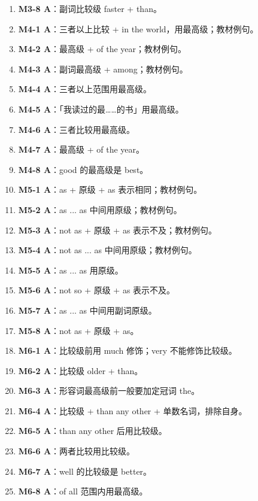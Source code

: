 \documentclass[11pt,a4paper]{ctexart}
\begin{document}
\begin{enumerate}[leftmargin=1.6em,itemsep=2pt]
\item \textbf{M3-8 A}：副词比较级 faster + than。
\item \textbf{M4-1 A}：三者以上比较 + in the world，用最高级；教材例句。
\item \textbf{M4-2 A}：最高级 + of the year；教材例句。
\item \textbf{M4-3 A}：副词最高级 + among；教材例句。
\item \textbf{M4-4 A}：三者以上范围用最高级。
\item \textbf{M4-5 A}：「我读过的最……的书」用最高级。
\item \textbf{M4-6 A}：三者比较用最高级。
\item \textbf{M4-7 A}：最高级 + of the year。
\item \textbf{M4-8 A}：good 的最高级是 best。
\item \textbf{M5-1 A}：as + 原级 + as 表示相同；教材例句。
\item \textbf{M5-2 A}：as ... as 中间用原级；教材例句。
\item \textbf{M5-3 A}：not as + 原级 + as 表示不及；教材例句。
\item \textbf{M5-4 A}：not as ... as 中间用原级；教材例句。
\item \textbf{M5-5 A}：as ... as 用原级。
\item \textbf{M5-6 A}：not so + 原级 + as 表示不及。
\item \textbf{M5-7 A}：as ... as 中间用副词原级。
\item \textbf{M5-8 A}：not as + 原级 + as。
\item \textbf{M6-1 A}：比较级前用 much 修饰；very 不能修饰比较级。
\item \textbf{M6-2 A}：比较级 older + than。
\item \textbf{M6-3 A}：形容词最高级前一般要加定冠词 the。
\item \textbf{M6-4 A}：比较级 + than any other + 单数名词，排除自身。
\item \textbf{M6-5 A}：than any other 后用比较级。
\item \textbf{M6-6 A}：两者比较用比较级。
\item \textbf{M6-7 A}：well 的比较级是 better。
\item \textbf{M6-8 A}：of all 范围内用最高级。
\end{enumerate}
\end{document}
